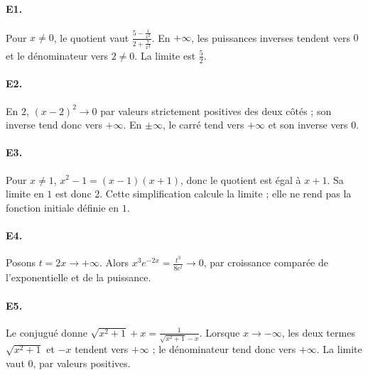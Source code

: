 \paragraph{E1.}Pour $x\ne0$, le quotient vaut $\frac{5-\frac{1}{x^2}}{2+\frac{7}{x^3}}$. En $+\infty$, les puissances inverses tendent vers $0$ et le dénominateur vers $2\ne0$. La limite est $\frac{5}{2}$.

\paragraph{E2.}En $2$, $(x-2)^2\to0$ par valeurs strictement positives des deux côtés ; son inverse tend donc vers $+\infty$. En $\pm\infty$, le carré tend vers $+\infty$ et son inverse vers $0$.

\paragraph{E3.}Pour $x\ne1$, $x^2-1=(x-1)(x+1)$, donc le quotient est égal à $x+1$. Sa limite en $1$ est donc $2$. Cette simplification calcule la limite ; elle ne rend pas la fonction initiale définie en $1$.

\paragraph{E4.}Posons $t=2x\to+\infty$. Alors $x^3e^{-2x}=\frac{t^3}{8e^t}\to0$, par croissance comparée de l'exponentielle et de la puissance.

\paragraph{E5.}Le conjugué donne $\sqrt{x^2+1}+x=\frac{1}{\sqrt{x^2+1}-x}$. Lorsque $x\to-\infty$, les deux termes $\sqrt{x^2+1}$ et $-x$ tendent vers $+\infty$ ; le dénominateur tend donc vers $+\infty$. La limite vaut $0$, par valeurs positives.

